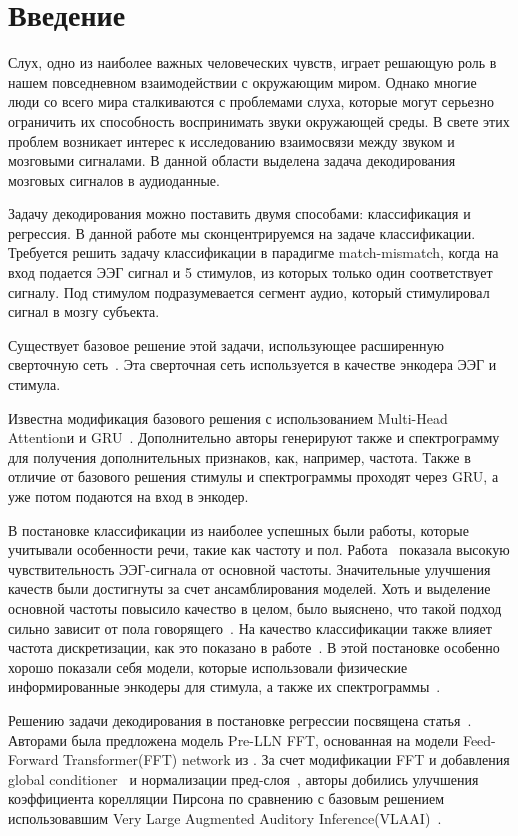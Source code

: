 \documentclass{article}
\begin{document}
\section{Введение} 
    \par 
    Слух, одно из наиболее важных человеческих чувств, играет решающую роль в нашем повседневном взаимодействии с окружающим миром. Однако многие люди со всего мира сталкиваются с проблемами слуха, которые могут серьезно ограничить их способность воспринимать звуки окружающей среды. В свете этих проблем возникает интерес к исследованию взаимосвязи между звуком и мозговыми сигналами. В данной области выделена задача декодирования мозговых сигналов в аудиоданные. 
    \par 
    Задачу декодирования можно поставить двумя способами: классификация и регрессия. В данной работе мы сконцентрируемся на задаче классификации. Требуется решить задачу классификации в парадигме match-mismatch, когда на вход подается ЭЭГ сигнал и 5 стимулов, из которых только один соответствует сигналу. Под стимулом подразумевается сегмент аудио, который стимулировал сигнал в мозгу субъекта. 
    \par 
    Существует базовое решение этой задачи, использующее расширенную сверточную сеть~\citep{Accou2021ModelingTR}. Эта сверточная сеть используется в качестве энкодера ЭЭГ и стимула.
    \par 
    Известна модификация базового решения с использованием Multi-Head Attentionи и GRU~\citep{multihead-gru}. Дополнительно авторы генерируют также и спектрограмму для получения дополнительных признаков, как, например, частота. Также в отличие от базового решения стимулы и спектрограммы проходят через GRU, а уже потом подаются на вход в энкодер. 
    \par 
    В постановке классификации из наиболее успешных были работы, которые учитывали особенности речи, такие как частоту и пол. Работа~\citep{Thornton2023RelatingER} показала высокую чувствительность ЭЭГ-сигнала от основной частоты. Значительные улучшения качеств были достигнуты за счет ансамблирования моделей. Хоть и выделение основной частоты повысило качество в целом, было выяснено, что такой подход сильно зависит от пола говорящего~\citep{Puffay2022RelatingTF}. На качество классификации также влияет частота дискретизации, как это показано в работе~\citep{Thornton2024DetectingGR}. В этой постановке особенно хорошо показали себя модели, которые использовали физические информированные энкодеры для стимула, а также их спектрограммы~\citep{Wang2024SelfsupervisedSR}.
    \par
    Решению задачи декодирования в постановке регрессии посвящена статья~\cite{piao2023happyquokka}. Авторами была предложена модель Pre-LLN FFT, основанная на модели Feed-Forward Transformer(FFT) network из \citep{ren2019fastspeech}. За счет модификации FFT и добавления global conditioner~\citep{vandenoord16_ssw} и нормализации пред-слоя~\citep{xiong2020layer}, авторы добились улучшения коэффициента корелляции Пирсона по сравнению с базовым решением использовавшим Very Large Augmented Auditory Inference(VLAAI)~\citep{vlaai}. 
\end{document}
